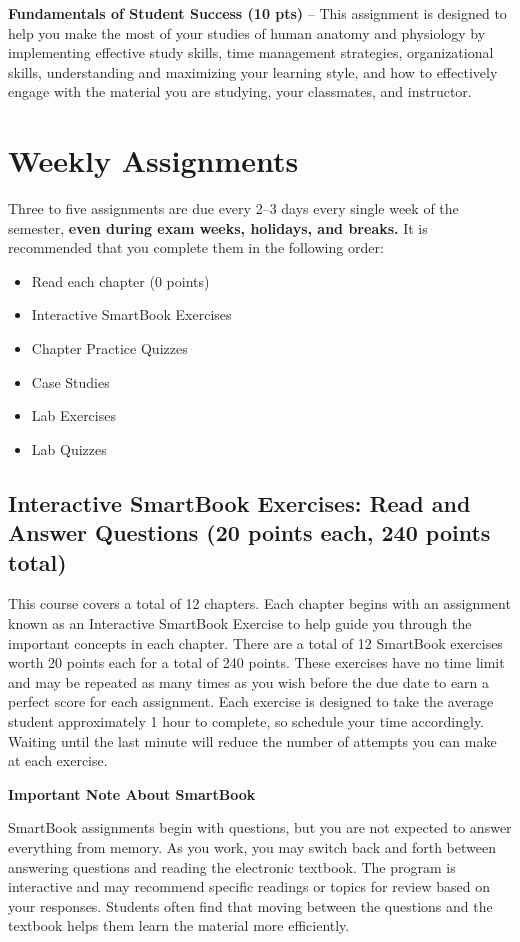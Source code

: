 \textbf{Fundamentals of Student Success (10 pts)} -- This assignment is designed to help you make the most of your studies of human anatomy and physiology by implementing effective study skills, time management strategies, organizational skills, understanding and maximizing your learning style, and how to effectively engage with the material you are studying, your classmates, and instructor.

\clearpage

\section*{Weekly Assignments}

Three to five assignments are due every 2--3 days every single week of the semester, \textbf{even during exam weeks, holidays, and breaks.} It is recommended that you complete them in the following order:

\begin{itemize}
  \item Read each chapter (0 points)
  \item Interactive SmartBook Exercises
  \item Chapter Practice Quizzes
  \item Case Studies
  \item Lab Exercises
  \item Lab Quizzes
\end{itemize}

\subsection*{Interactive SmartBook Exercises: Read and Answer Questions (20 points each, 240 points total)}

This course covers a total of 12 chapters. Each chapter begins with an assignment known as an Interactive SmartBook Exercise to help guide you through the important concepts in each chapter. There are a total of 12 SmartBook exercises worth 20 points each for a total of 240 points. These exercises have no time limit and may be repeated as many times as you wish before the due date to earn a perfect score for each assignment. Each exercise is designed to take the average student approximately 1 hour to complete, so schedule your time accordingly. Waiting until the last minute will reduce the number of attempts you can make at each exercise.

\begin{tcolorbox}[coursetip]
{\bfseries Important Note About SmartBook}

SmartBook assignments begin with questions, but you are not expected to answer everything from memory. As you work, you may switch back and forth between answering questions and reading the electronic textbook. The program is interactive and may recommend specific readings or topics for review based on your responses. Students often find that moving between the questions and the textbook helps them learn the material more efficiently.
\end{tcolorbox}

